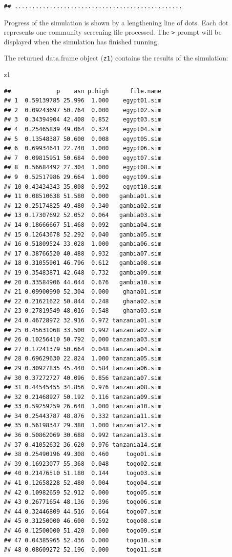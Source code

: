 \documentclass[12pt,a4paper]{book}
\newenvironment{Shaded}{\begin{snugshade}}{\end{snugshade}}
\newcommand{\NormalTok}[1]{#1}
\theoremstyle{definition}
\theoremstyle{definition}
\theoremstyle{definition}
\theoremstyle{remark}
\begin{document}
\begin{verbatim}
## ................................................
\end{verbatim}

Progress of the simulation is shown by a lengthening line of dots. Each
dot represents one community screening file processed. The
\texttt{\textgreater{}} prompt will be displayed when the simulation has
finished running.

The returned data.frame object (\texttt{z1}) contains the results of the
simulation:

\begin{Shaded}
\begin{Highlighting}[]
\NormalTok{z1}
\end{Highlighting}
\end{Shaded}

\begin{verbatim}
##             p    asn p.high      file.name
## 1  0.59139785 25.996  1.000    egypt01.sim
## 2  0.09243697 50.764  0.000    egypt02.sim
## 3  0.34394904 42.408  0.852    egypt03.sim
## 4  0.25465839 49.064  0.324    egypt04.sim
## 5  0.13548387 50.600  0.008    egypt05.sim
## 6  0.69934641 22.740  1.000    egypt06.sim
## 7  0.09815951 50.684  0.000    egypt07.sim
## 8  0.56684492 27.304  1.000    egypt08.sim
## 9  0.52517986 29.664  1.000    egypt09.sim
## 10 0.43434343 35.008  0.992    egypt10.sim
## 11 0.08510638 51.580  0.000   gambia01.sim
## 12 0.25174825 49.480  0.340   gambia02.sim
## 13 0.17307692 52.052  0.064   gambia03.sim
## 14 0.18666667 51.468  0.092   gambia04.sim
## 15 0.12643678 52.292  0.040   gambia05.sim
## 16 0.51809524 33.028  1.000   gambia06.sim
## 17 0.38766520 40.488  0.932   gambia07.sim
## 18 0.31055901 46.796  0.612   gambia08.sim
## 19 0.35483871 42.648  0.732   gambia09.sim
## 20 0.33584906 44.044  0.676   gambia10.sim
## 21 0.09900990 52.304  0.000    ghana01.sim
## 22 0.21621622 50.844  0.248    ghana02.sim
## 23 0.27819549 48.016  0.548    ghana03.sim
## 24 0.46728972 32.916  0.972 tanzania01.sim
## 25 0.45631068 33.500  0.992 tanzania02.sim
## 26 0.10256410 50.792  0.000 tanzania03.sim
## 27 0.17241379 50.664  0.048 tanzania04.sim
## 28 0.69629630 22.824  1.000 tanzania05.sim
## 29 0.30927835 45.440  0.584 tanzania06.sim
## 30 0.37272727 40.096  0.856 tanzania07.sim
## 31 0.44545455 34.856  0.976 tanzania08.sim
## 32 0.21468927 50.192  0.116 tanzania09.sim
## 33 0.59259259 26.640  1.000 tanzania10.sim
## 34 0.25443787 48.876  0.332 tanzania11.sim
## 35 0.56198347 29.380  1.000 tanzania12.sim
## 36 0.50862069 30.688  0.992 tanzania13.sim
## 37 0.41052632 36.620  0.976 tanzania14.sim
## 38 0.25490196 49.308  0.460     togo01.sim
## 39 0.16923077 55.368  0.048     togo02.sim
## 40 0.21476510 51.180  0.144     togo03.sim
## 41 0.12658228 52.480  0.004     togo04.sim
## 42 0.10982659 52.912  0.000     togo05.sim
## 43 0.26771654 48.136  0.396     togo06.sim
## 44 0.32446809 44.516  0.664     togo07.sim
## 45 0.31250000 46.600  0.592     togo08.sim
## 46 0.12500000 51.420  0.000     togo09.sim
## 47 0.04385965 52.436  0.000     togo10.sim
## 48 0.08609272 52.196  0.000     togo11.sim
\end{verbatim}
\end{document}
